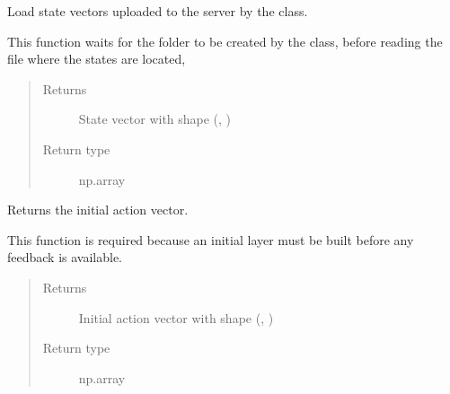 \documentclass[letterpaper,10pt,english,openany,oneside]{sphinxmanual}
\begin{document}
\begin{fulllineitems}
\begin{fulllineitems}
\end{fulllineitems}


\begin{fulllineitems}
\label{\detokenize{_modules/cluster:cluster.Cluster.getStates}}
Load state vectors uploaded to the server by the  class.

This function waits for the  folder to be
created by the  class, before reading the file where the states
are located, 
\begin{quote}\begin{description}
\item[{Returns}] \leavevmode
State vector with shape (, )

\item[{Return type}] \leavevmode
np.array

\end{description}\end{quote}

\end{fulllineitems}


\begin{fulllineitems}
\label{\detokenize{_modules/cluster:cluster.Cluster.initAction}}
Returns the initial action vector.

This function is required because an initial layer must be built before
any feedback is available.
\begin{quote}\begin{description}
\item[{Returns}] \leavevmode
Initial action vector with shape (, )

\item[{Return type}] \leavevmode
np.array

\end{description}\end{quote}

\end{fulllineitems}


\end{fulllineitems}
\end{document}

